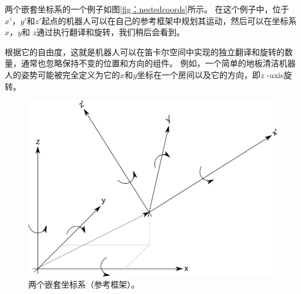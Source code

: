
两个嵌套坐标系的一个例子如图\ref {fig：nestedcoords}所示。 在这个例子中，位于$ x'，y'$和$ z'$起点的机器人可以在自己的参考框架中规划其运动，然后可以在坐标系$ x $，$ y $和 $ z $通过执行翻译和旋转，我们稍后会看到。


根据它的自由度，这就是机器人可以在笛卡尔空间中实现的独立翻译和旋转的数量，通常也忽略保持不变的位置和方向的组件。 例如，一个简单的地板清洁机器人的姿势可能被完全定义为它的$ x $和$ y $坐标在一个房间以及它的方向，即$ z $ -axis旋转。

\begin{figure}
	\centering
		\includegraphics[width=\textwidth]{figs/frameofreference.png}
	\caption{两个嵌套坐标系（参考框架）。}
	\label{fig:nestedcoords}
\end{figure}

